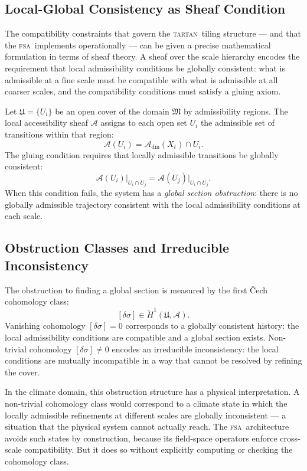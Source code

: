 \documentclass[11pt,a4paper]{article}
\theoremstyle{plain}
\theoremstyle{definition}
\theoremstyle{remark}
\newcommand{\fM}{\mathfrak{M}}
\newcommand{\Adm}{\mathcal{A}_{\mathrm{dm}}}
\newcommand{\TARTAN}{\textup{\textsc{tartan}}}
\newcommand{\FSA}{\textup{\textsc{fsa}}}
\newcommand{\scrA}{\mathscr{A}}
\begin{document}
\subsection{Local-Global Consistency as Sheaf Condition}

The compatibility constraints that govern the \TARTAN\ tiling structure ---
and that the \FSA\ implements operationally --- can be given a precise
mathematical formulation in terms of sheaf theory. A sheaf over the scale
hierarchy encodes the requirement that local admissibility conditions be
globally consistent: what is admissible at a fine scale must be compatible
with what is admissible at all coarser scales, and the compatibility
conditions must satisfy a gluing axiom.

Let $\mathfrak{U} = \{U_i\}$ be an open cover of the domain $\fM$ by
admissibility regions. The local accessibility sheaf $\scrA$ assigns to
each open set $U_i$ the admissible set of transitions within that region:
\[
\scrA(U_i) = \Adm(X_t) \cap U_i.
\]
The gluing condition requires that locally admissible transitions be
globally consistent:
\[
\scrA(U_i)\big|_{U_i \cap U_j} = \scrA(U_j)\big|_{U_i \cap U_j}.
\]
When this condition fails, the system has a \emph{global section
obstruction}: there is no globally admissible trajectory consistent with
the local admissibility conditions at each scale.

\subsection{Obstruction Classes and Irreducible Inconsistency}

The obstruction to finding a global section is measured by the first
\v{C}ech cohomology class:
\[
[\delta\sigma] \in \check{H}^1(\mathfrak{U}, \scrA).
\]
Vanishing cohomology $[\delta\sigma] = 0$ corresponds to a globally
consistent history: the local admissibility conditions are compatible and
a global section exists. Non-trivial cohomology $[\delta\sigma] \neq 0$
encodes an irreducible inconsistency: the local conditions are mutually
incompatible in a way that cannot be resolved by refining the cover.

In the climate domain, this obstruction structure has a physical
interpretation. A non-trivial cohomology class would correspond to a
climate state in which the locally admissible refinements at different
scales are globally inconsistent --- a situation that the physical system
cannot actually reach. The \FSA\ architecture avoids such states by
construction, because its field-space operators enforce cross-scale
compatibility. But it does so without explicitly computing or checking the
cohomology class.
\end{document}
